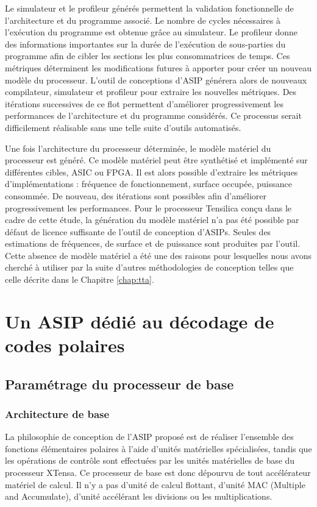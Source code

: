Le simulateur et le profileur générés permettent la validation fonctionnelle de l'architecture et du programme associé. Le nombre de cycles nécessaires à l'exécution du programme est obtenue grâce au simulateur. Le profileur donne des informations importantes sur la durée de l'exécution de sous-parties du programme afin de cibler les sections les plus consommatrices de temps. Ces métriques déterminent les modifications futures à apporter pour créer un nouveau modèle du processeur. L'outil de conceptions d'ASIP générera alors de nouveaux compilateur, simulateur et profileur pour extraire les nouvelles métriques. Des itérations successives de ce flot permettent d'améliorer progressivement les performances de l'architecture et du programme considérés. Ce processus serait difficilement réalisable sans une telle suite d'outils automatisés.

Une fois l'architecture du processeur déterminée, le modèle matériel du processeur est généré. Ce modèle matériel peut être synthétisé et implémenté sur différentes cibles, ASIC ou FPGA. Il est alors possible d'extraire les métriques d'implémentations : fréquence de fonctionnement, surface occupée, puissance consommée. De nouveau, des itérations sont possibles afin d'améliorer progressivement les performances.
Pour le processeur Tensilica conçu dans le cadre de cette étude, la génération du modèle matériel n'a pas été possible par défaut de licence suffisante de l'outil de conception d'ASIPs. Seules des estimations de fréquences, de surface et de puissance sont produites par l'outil. Cette absence de modèle matériel a été une des raisons pour lesquelles nous avons cherché à utiliser par la suite d'autres méthodologies de conception telles que celle décrite dans le Chapitre \ref{chap:tta}.

\section{Un ASIP dédié au décodage de codes polaires}
\label{subsec:sota_sc}
\subsection{Paramétrage du processeur de base}
\subsubsection{Architecture de base}
La philosophie de conception de l'ASIP proposé est de réaliser l'ensemble des fonctions élémentaires polaires à l'aide d'unités matérielles spécialisées, tandis que les opérations de contrôle sont effectuées par les unités matérielles de base du processeur XTensa. Ce processeur de base est donc dépourvu de tout accélérateur matériel de calcul. Il n'y a pas d'unité de calcul flottant, d'unité MAC (Multiple and Accumulate), d'unité accélérant les divisions ou les multiplications.

